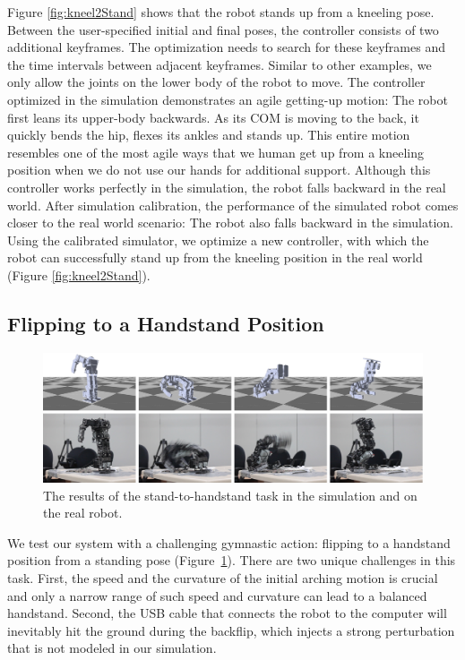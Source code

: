 Figure \ref{fig:kneel2Stand} shows that the robot stands up from a kneeling pose. Between the user-specified initial and final poses, the controller consists of two additional keyframes. The optimization needs to search for these keyframes and the time intervals between adjacent keyframes. Similar to other examples, we only allow the joints on the lower body of the robot to move. The controller optimized in the simulation demonstrates an agile getting-up motion: The robot first leans its upper-body backwards. As its COM is moving to the back, it quickly bends the hip, flexes its ankles and stands up. This entire motion resembles one of the most agile ways that we human get up from a kneeling position when we do not use our hands for additional support. Although this controller works perfectly in the simulation, the robot falls backward in the real world. After simulation calibration, the performance of the simulated robot comes closer to the real world scenario: The robot also falls backward in the simulation. Using the calibrated simulator, we optimize a new controller, with which the robot can successfully stand up from the kneeling position in the real world (Figure \ref{fig:kneel2Stand}).


\subsection{Flipping to a Handstand Position}


\begin{figure}[!t]
  \centering
  \includegraphics[width=\textwidth]{figures/stand2Hand}
  \caption{The results of the stand-to-handstand task in the simulation and on the real robot.}
  \label{fig:stand2Hand}
\end{figure}

We test our system with a challenging gymnastic action: flipping to a handstand position from a standing pose (Figure~\ref{fig:stand2Hand}). There are two unique challenges in this task. First, the speed and the curvature of the initial arching motion is crucial and only a narrow range of such speed and curvature can lead to a balanced handstand. Second, the USB cable that connects the robot to the computer will inevitably hit the ground during the backflip, which injects a strong perturbation that is not modeled in our simulation.

